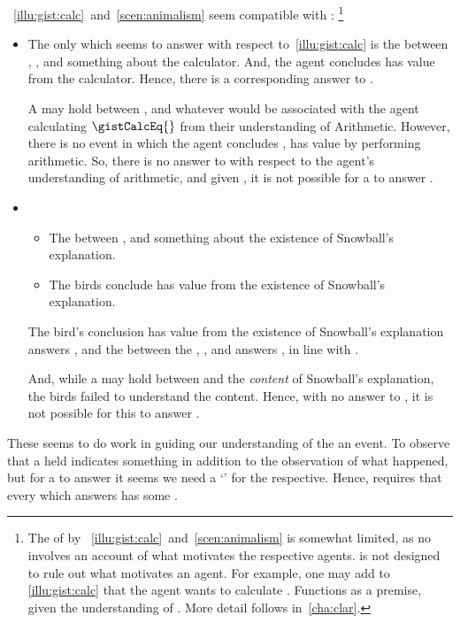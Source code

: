 \begin{note}
  ~\ref{illu:gist:calc}~and~\ref{scen:animalism} seem compatible with \issueInclusion{}:%
  \footnote{
    The  of \qWhy{} by ~\ref{illu:gist:calc}~and~\ref{scen:animalism} is somewhat limited, as no  involves an account of what motivates the respective agents.
    \qWhy{} is not designed to rule out what motivates an agent.
    For example, one may add to \autoref{illu:gist:calc} that the agent wants to calculate \gistCalcLHS{}.
    Functions as a premise, given the understanding of .
    More detail follows in~\autoref{cha:clar}.
  }

  \begin{itemize}[noitemsep]
  \item
    The only \ros{} which seems to answer \qWhy{} with respect to~\autoref{illu:gist:calc} is the \ros{} between \propM{\gistCalcEq{}}, , and something about the calculator.
    And, the agent concludes \propM{\gistCalcEq{}} has value  from the calculator.
    Hence, there is a corresponding answer to \qHow{}.

    A \ros{} may hold between \propM{\gistCalcEq{}},  and whatever \pool{} would be associated with the agent calculating \(\gistCalcEq{}\) from their understanding of Arithmetic.
    However, there is no event in which the agent concludes \propM{\gistCalcEq{}}, has value  by performing arithmetic.
    So, there is no answer to \qHow{} with respect to the agent's understanding of arithmetic, and given \issueInclusion{}, it is not possible for a \ros{} to answer \qWhy{}.
  \item
    \begin{itemize}
    \item
      The \ros{} between ,  and something about the existence of Snowball's explanation.
    \item
      The birds conclude  has value  from the existence of Snowball's explanation.
    \end{itemize}

    The bird's conclusion  has value  from the existence of Snowball's explanation answers \qHow{}, and the \ros{} between the , , and \pool{} answers \qWhy{}, in line with \issueInclusion{}.

    And, while a \ros{} may hold between   and the \emph{content} of Snowball's explanation, the birds failed to understand the content.
    Hence, with no answer to \qHow{}, it is not possible for this \ros{} to answer \qWhy{}.
  \end{itemize}
  These \ros{} seems to do work in guiding our understanding of the an event.
  To observe that a \ros{} held indicates something in addition to the observation of what happened, but for a \ros{} to answer \qWhy{} it seems we need a `\wit{}' for the respective.
  Hence, \issueInclusion{} requires that every \ros{} which answers \qWhy{} has some \wit{}.
\end{note}

